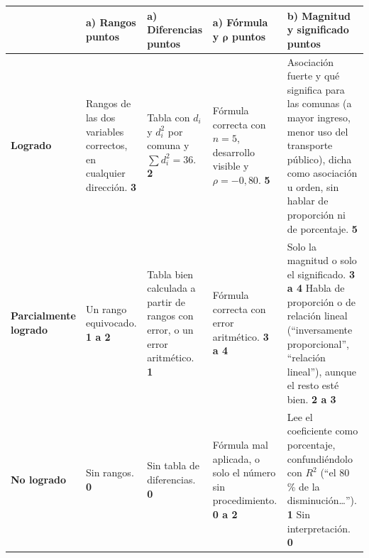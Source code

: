 \documentclass[11pt]{article}
\begin{document}
\vspace{2pt}
{\small
\begin{tabularx}{\linewidth}{@{} >{\bfseries}p{1.9cm} L L L >{\hsize}L @{}}
\toprule
 & \textbf{a) Rangos}  puntos
 & \textbf{a) Diferencias}  puntos
 & \textbf{a) Fórmula y $\boldsymbol{\rho}$}  puntos
 & \textbf{b) Magnitud y significado}  puntos \\
\midrule
{}
Logrado
 & Rangos de las dos variables correctos, en cualquier dirección. \newline \textbf{3}
 & Tabla con $d_i$ y $d_i^2$ por comuna y $\sum d_i^2 = 36$. \newline \textbf{2}
 & Fórmula correcta con $n = 5$, desarrollo visible y $\rho = -0{,}80$. \newline \textbf{5}
 & Asociación fuerte y qué significa para las comunas (a mayor ingreso, menor uso del transporte público), dicha como asociación u orden, sin hablar de proporción ni de porcentaje. \newline \textbf{5} \\
Parcialmente logrado
 & Un rango equivocado. \newline \textbf{1 a 2}
 & Tabla bien calculada a partir de rangos con error, o un error aritmético. \newline \textbf{1}
 & Fórmula correcta con error aritmético. \newline \textbf{3 a 4}
 & Solo la magnitud o solo el significado. \newline \textbf{3 a 4} \newline Habla de proporción o de relación lineal (``inversamente proporcional'', ``relación lineal''), aunque el resto esté bien. \newline \textbf{2 a 3} \\
No logrado
 & Sin rangos. \newline \textbf{0}
 & Sin tabla de diferencias. \newline \textbf{0}
 & Fórmula mal aplicada, o solo el número sin procedimiento. \newline \textbf{0 a 2}
 & Lee el coeficiente como porcentaje, confundiéndolo con $R^2$ (``el 80\,\% de la disminución\ldots''). \newline \textbf{1} \newline Sin interpretación. \newline \textbf{0} \\
\bottomrule
\end{tabularx}
}
\end{document}
